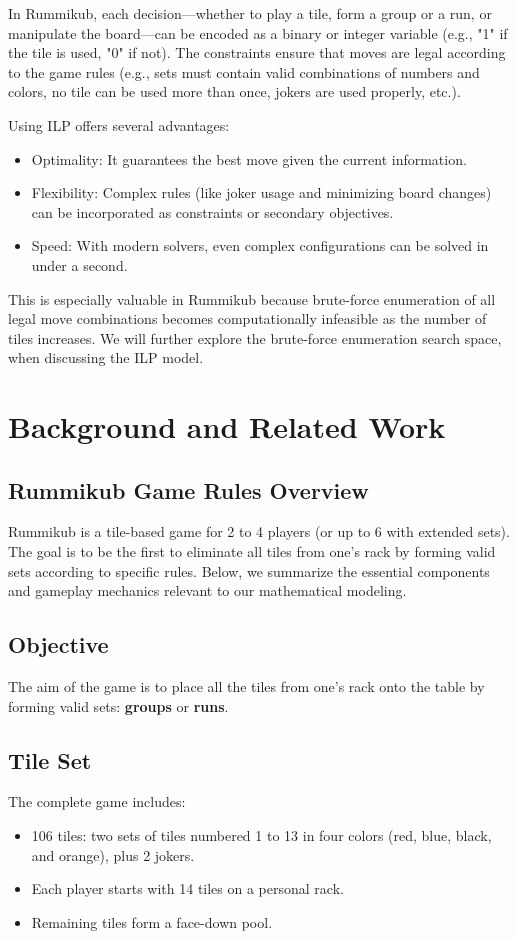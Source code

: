 \documentclass[12pt]{article}
\begin{document}
In Rummikub, each decision—whether to play a tile, form a group or a run, or manipulate the 
board—can be encoded as a binary or integer variable (e.g., "1" if the tile is used, "0" if 
not). The constraints ensure that moves are legal according to the game rules (e.g., sets 
must contain valid combinations of numbers and colors, no tile can be used more than once, 
jokers are used properly, etc.).

Using ILP offers several advantages:
\begin{itemize}
    \item Optimality: It guarantees the best move given the current information.

    \item Flexibility: Complex rules (like joker usage and minimizing board changes) can be incorporated as constraints or secondary objectives.

    \item Speed: With modern solvers, even complex configurations can be solved in under a second.

\end{itemize}
This is especially valuable in Rummikub because brute-force enumeration of all legal move 
combinations becomes computationally infeasible as the number of tiles increases. We will further
explore the brute-force enumeration search space, when discussing the ILP model. 
\section{Background and Related Work}
\subsection{Rummikub Game Rules Overview}
Rummikub is a tile-based game for 2 to 4 players (or up to 6 with extended sets). The goal is to be the first to eliminate all tiles from one's rack by forming valid sets according to specific rules. Below, we summarize the essential components and gameplay mechanics relevant to our mathematical modeling.

\subsection{Objective}
The aim of the game is to place all the tiles from one's rack onto the table by forming valid sets: \textbf{groups} or \textbf{runs}.

\subsection{Tile Set}
The complete game includes:
\begin{itemize}
    \item 106 tiles: two sets of tiles numbered 1 to 13 in four colors (red, blue, black, and orange), plus 2 jokers.
    \item Each player starts with 14 tiles on a personal rack.
    \item Remaining tiles form a face-down pool.
\end{itemize}
\end{document}
